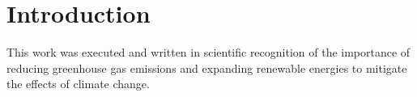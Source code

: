 \documentclass[a4paper,11pt]{article}
\begin{document}
\newpage
\listoftables
{}

\newpage
\pagestyle{plain}       
\setcounter{page}{1}    %

\hypertarget{introduction}{%
\section{Introduction}\label{introduction}}

This work was executed and written in scientific recognition of the importance of reducing greenhouse gas emissions and expanding renewable energies to mitigate the effects of climate change.
\end{document}
